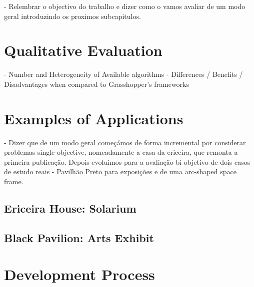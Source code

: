 \cleardoublepage
\label{chap:implement}

 - Relembrar o objectivo do trabalho e dizer como o vamos avaliar de um modo geral introduzindo os proximos subcapitulos.
 
\section{Qualitative Evaluation}
- Number and Heterogeneity of Available algorithms
- Differences / Benefits / Disadvantages when compared to Grasshopper's frameworks

\section{Examples of Applications}

- Dizer que de um modo geral começámos de forma incremental por considerar problemas single-objective, nomeadamente a casa da ericeira, que remonta a primeira publicação. Depois evoluimos para a avaliação bi-objetivo de dois casos de estudo reais - Pavilhão Preto para exposições e de uma arc-shaped space frame.


\subsection{Ericeira House: Solarium}

\subsection{Black Pavilion: Arts Exhibit}

\section{Development Process}

